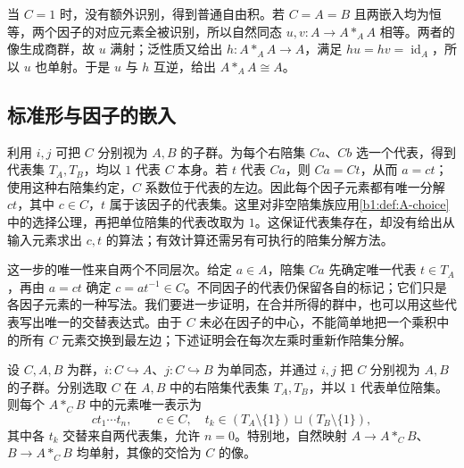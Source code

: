 当 \(C=1\) 时，没有额外识别，得到普通自由积。若 \(C=A=B\) 且两嵌入均为恒等，两个因子的对应元素全被识别，所以自然同态 \(u,v:A\to A*_A A\) 相等。两者的像生成商群，故 \(u\) 满射；泛性质又给出 \(h:A*_A A\to A\)，满足 \(hu=hv=\operatorname{id}_A\)，所以 \(u\) 也单射。于是 \(u\) 与 \(h\) 互逆，给出 \(A*_A A\cong A\)。

\subsection{标准形与因子的嵌入}
\label{b1:subsec:C01:03}

利用 \(i,j\) 可把 \(C\) 分别视为 \(A,B\) 的子群。为每个右陪集 \(Ca\)、\(Cb\) 选一个代表，得到代表集 \(T_A,T_B\)，均以 \(1\) 代表 \(C\) 本身。若 \(t\) 代表 \(Ca\)，则 \(Ca=Ct\)，从而 \(a=ct\)；使用这种右陪集约定，\(C\) 系数位于代表的左边。因此每个因子元素都有唯一分解 \(ct\)，其中 \(c\in C\)，\(t\) 属于该因子的代表集。这里对非空陪集族应用\cref{b1:def:A-choice}中的选择公理，再把单位陪集的代表改取为 \(1\)。这保证代表集存在，却没有给出从输入元素求出 \(c,t\) 的算法；有效计算还需另有可执行的陪集分解方法。

\ProseParagraphBreak
这一步的唯一性来自两个不同层次。给定 \(a\in A\)，陪集 \(Ca\) 先确定唯一代表 \(t\in T_A\)，再由 \(a=ct\) 确定 \(c=at^{-1}\in C\)。不同因子的代表仍保留各自的标记；它们只是各因子元素的一种写法。我们要进一步证明，在合并所得的群中，也可以用这些代表写出唯一的交替表达式。由于 \(C\) 未必在因子的中心，不能简单地把一个乘积中的所有 \(C\) 元素交换到最左边；下述证明会在每次左乘时重新作陪集分解。

\begin{theorem}[带合并自由积的标准形]\label{b1:thm:amalgam-normal-form}
	设 \(C,A,B\) 为群，\(i:C\hookrightarrow A\)、\(j:C\hookrightarrow B\) 为单同态，并通过 \(i,j\) 把 \(C\) 分别视为 \(A,B\) 的子群。分别选取 \(C\) 在 \(A,B\) 中的右陪集代表集 \(T_A,T_B\)，并以 \(1\) 代表单位陪集。则每个 \(A*_C B\) 中的元素唯一表示为
	\[
		c t_1\cdots t_n, \qquad c\in C,\quad t_k\in(T_A\setminus\{1\})\sqcup(T_B\setminus\{1\}),
	\]
	其中各 \(t_k\) 交替来自两代表集，允许 \(n=0\)。特别地，自然映射 \(A\rightarrow A*_C B\)、\(B\rightarrow A*_C B\) 均单射，其像的交恰为 \(C\) 的像。
\end{theorem}

